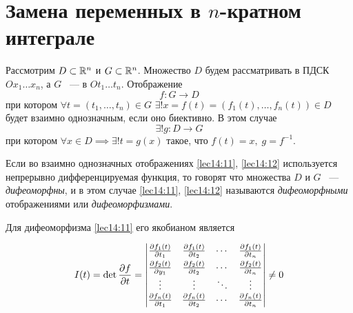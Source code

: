 \documentclass[../../main.tex]{subfiles}
\begin{document}
	\section{Замена переменных в $n$-кратном интеграле}
	
	Рассмотрим $D \subset \mathbb{R}^n$ и $G \subset \mathbb{R}^n$. Множество $D$ будем 
	рассматривать в ПДСК\\ $Ox_1 \ldots x_n$, а $G$ ~--- в $Ot_1 \ldots t_n$.
	Отображение 
	\begin{equation}
	\label{lec14:11}
	f : G \to D
	\end{equation} при котором 
	$\forall t = \left( t_1, \ldots, t_n \right) \in G$ $\exists ! 
	x = f\left(t\right) = \left(f_1\left( t\right) , \ldots, f_n\left( t\right)  
	\right)  \in D$
	будет взаимно однозначным, если оно биективно. В этом случае 
	\begin{equation}
	\label{lec14:12}
	\exists ! g :  D \to G
	\end{equation}
	при котором $\forall x \in D \implies  \exists ! t = g\left( x\right) $ 
	такое, что 
	$f\left( t\right)  = x,\; g = f^{-1}$.
	
	Если во взаимно однозначных отображениях \eqref{lec14:11}, \eqref{lec14:12}
	используется непрерывно дифференцируемая функция, то говорят что множества 
	$D$ и $G$ ~--- \emph{дифеоморфны}, и в этом случае 
	\eqref{lec14:11}, \eqref{lec14:12} называются \emph{дифеоморфными} 
	отображениями
	или \emph{дифеоморфизмами}.
	
	Для дифеоморфизма \eqref{lec14:11} его якобианом является 
	
	\begin{equation}
	\label{lec14:13}
	I(t) = \det \frac{\partial f}{\partial t}=
	\begin{vmatrix}
	\smallskip
	\frac{\partial f_1\left(t\right)}{\partial t_1} & \frac{\partial 
	f_1\left(t\right)}{\partial t_2}
	& \cdots & \frac{\partial f_1\left(t\right)}{\partial t_n} \\
	\frac{\partial f_2\left(t\right)}{\partial y_1} & \frac{\partial 
	f_2\left(t\right)}{\partial t_2} 
	& \cdots & \frac{\partial f_2\left(t\right)}{\partial t_n} \\
	\vdots  & \vdots  & \ddots & \vdots  \\
	\frac{\partial f_n\left(t\right)}{\partial t_1} & \frac{\partial 
	f_n\left(t\right)}{\partial t_2}
	& \cdots & \frac{\partial f_n\left(t\right)}{\partial t_n}
	\end{vmatrix} \ne 0
	\end{equation}
	
\end{document}
